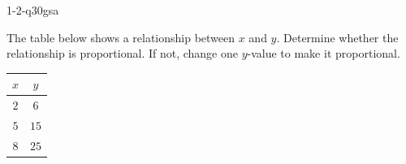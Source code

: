 \begin{practiceQuestion}{1-2-q30}{gsa}
\begin{questionText}
The table below shows a relationship between $x$ and $y$. Determine whether the relationship is proportional. If not, change one $y$-value to make it proportional.

\begin{center}
\begin{tabular}{|c|c|}
\hline $x$ & $y$ \\ \hline
$2$ & $6$ \\ \hline
$5$ & $15$ \\ \hline
$8$ & $25$ \\ \hline
\end{tabular}
\end{center}
\end{questionText}
\end{practiceQuestion}

